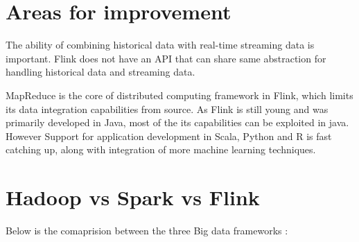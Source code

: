 \section{Areas for improvement}

The ability of combining historical data with real-time streaming data is important. Flink does not have an API that can share same abstraction for handling historical data and streaming data.~\cite{[3]}

MapReduce is the core of distributed computing framework in Flink, which limits its data integration capabilities from source.
As Flink is still young and was primarily developed in Java, most of the its capabilities can be exploited in java. However Support for application development in Scala, Python and R is fast catching up, along with integration of more machine learning techniques. 

\section{Hadoop vs Spark vs Flink}

Below is the comaprision between the three Big data frameworks :

